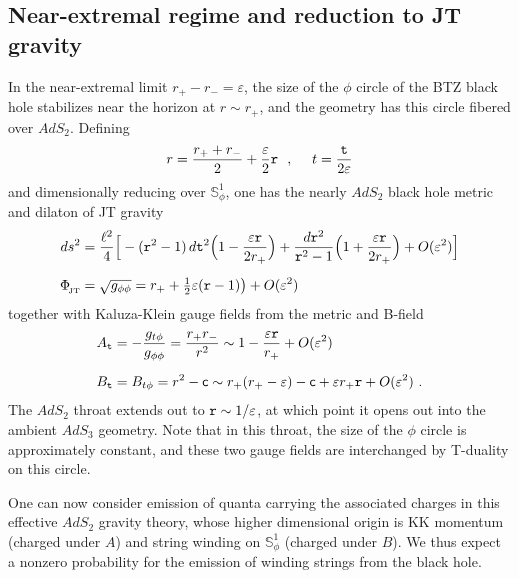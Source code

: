 \documentclass[11pt]{article}
\def\that{{\tt t}}
\def\rhat{{\tt r}}
\def\vareps{\varepsilon}
\def\[{\left[}
\def\sfc{{\mathsf c}}
\def\half{\frac12}
\def\coeff#1#2{{\textstyle \frac{#1}{#2}}}
\def\hf{\coeff12}
\def\be{\begin{equation}}
\def\ee{\end{equation}}
\newcommand{\bS}{{\mathbb S}}
\numberwithin{equation}{section}
\def\sst{\scriptscriptstyle}
\def\coeff#1#2{{\textstyle{\frac{#1}{ #2}}}}
\def\half{\frac12}
\def\hf{{\textstyle\half}}
\def\vareps{\varepsilon}
\begin{document}

\subsection{Near-extremal regime and reduction to JT gravity}
\label{sec:JTlimit}


In the near-extremal limit $r_+ - r_-=\varepsilon$, the size of the $\phi$ circle of the BTZ black hole stabilizes near the horizon at $r\sim r_+$, and the geometry has this circle fibered over $AdS_2$.  Defining
\be
\label{AdS2limit}
r=\frac{r_++r_-}2+\frac\vareps2\rhat
~~,~~~~
t = \frac{\that}{2\vareps}
\ee
and dimensionally reducing over $\bS^1_\phi$, one has the nearly $AdS_2$ black hole metric and dilaton of JT gravity
\begin{align}
\begin{split}
\label{JTmetric}
ds^2 &= \frac{\ell^2}4\Big[ -(\rhat^2-1) \,d\that^2 \Big(1- \frac{\vareps\rhat}{2r_+}\Big) +\frac{d\rhat^2}{\rhat^2-1} \Big(1+\frac{\vareps\rhat}{2r_+}\Big) + O(\vareps^2) \Big]
\\[.2cm]
\Phi_{\rm\sst \!JT}^{~} &= \sqrt{g_{\phi\phi}} = r_+ + \hf\vareps(\rhat-1)\big) + O(\vareps^2)
\end{split}
\end{align}
together with Kaluza-Klein gauge fields from the metric and B-field
\begin{align}
\begin{split}
\label{AdS2potls}
A_\that &= -\frac{g_{t\phi}}{g_{\phi\phi}} = \frac{r_+ r_-}{r^2} \sim 1-\frac{\vareps\rhat}{r_+}+ O(\vareps^2)
\\[.2cm]
B_\that &= B_{t\phi} = r^2 - \sfc \sim  r_+(r_+ -\vareps)-\sfc + \vareps  r_+ \rhat + O(\vareps^2) ~.
\end{split}
\end{align}
The $AdS_2$ throat extends out to $\rhat\sim 1/\vareps$, at which point it opens out into the ambient $AdS_3$ geometry.  Note that in this throat, the size of the $\phi$ circle is approximately constant, and these two gauge fields are interchanged by T-duality on this circle.

One can now consider emission of quanta carrying the associated charges in this effective $AdS_2$ gravity theory, whose higher dimensional origin is KK momentum (charged under $A$) and string winding on $\bS^1_\phi$ (charged under $B$).  We thus expect a nonzero probability for the emission of winding strings from the black hole.
\end{document}
